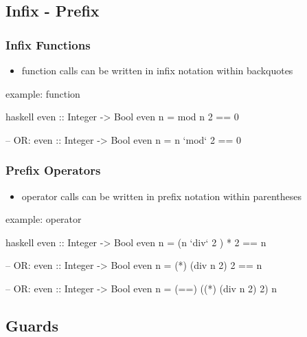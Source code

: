 \documentclass[dvipsnames]{beamer}
\theoremstyle{plain}
\begin{document}
\subsection{Infix - Prefix}

\begin{frame}[fragile]
  \frametitle{Infix Functions}

  \begin{itemize}
    \item function calls can be written in infix notation within backquotes
  \end{itemize}

  \begin{exampleblock}{example:  function}
    \begin{pygments}{haskell}
even :: Integer -> Bool
even n = mod n 2 == 0

-- OR:
even :: Integer -> Bool
even n = n `mod` 2 == 0
    \end{pygments}
  \end{exampleblock}
\end{frame}

\begin{frame}[fragile]
  \frametitle{Prefix Operators}

  \begin{itemize}
    \item operator calls can be written in prefix notation within parentheses
  \end{itemize}

  \begin{exampleblock}{example:  operator}
    \begin{pygments}{haskell}
even :: Integer -> Bool
even n = (n `div` 2 ) * 2 == n

-- OR:
even :: Integer -> Bool
even n = (*) (div n 2) 2 == n

-- OR:
even :: Integer -> Bool
even n = (==) ((*) (div n 2) 2) n
    \end{pygments}
  \end{exampleblock}
\end{frame}

\subsection{Guards}
\end{document}
